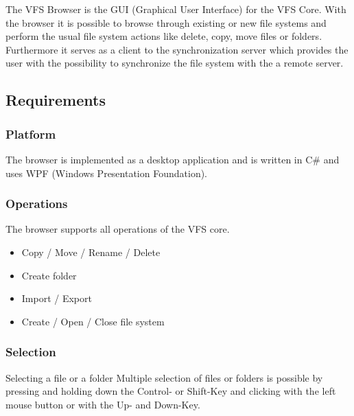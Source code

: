 \documentclass[JCDReport.tex]{subfiles}
\begin{document}
The VFS Browser is the GUI (Graphical User Interface) for the VFS Core.
With the browser it is possible to browse through existing or new file systems and perform the usual file system actions like delete, copy, move files or folders. Furthermore it serves as a client to the synchronization server which provides the user with the possibility to synchronize the file system with the a remote server.


\subsection{Requirements}
\subsubsection{Platform}
The browser is implemented as a desktop application and is written in C\# and uses WPF (Windows Presentation Foundation).

\subsubsection{Operations}
The browser supports all operations of the VFS core.
\begin{itemize}
  \item Copy / Move / Rename / Delete
  \item Create folder
  \item Import / Export
  \item Create / Open / Close file system
\end{itemize}

\subsubsection{Selection}
Selecting a file or a folder 
Multiple selection of files or folders is possible by pressing and holding down the Control- or Shift-Key and clicking with the left mouse button or with the Up- and Down-Key.
\end{document}
